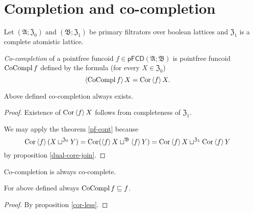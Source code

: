 \section{Completion and co-completion}
\begin{defn}
Let $(\mathfrak{A};\mathfrak{Z}_{0})$ and $(\mathfrak{B};\mathfrak{Z}_{1})$
be primary filtrators over boolean lattices and $\mathfrak{Z}_{1}$
is a complete atomistic lattice.

\emph{Co-completion}
of a pointfree funcoid $f\in\mathsf{pFCD}(\mathfrak{A};\mathfrak{B})$
is pointfree funcoid $\operatorname{CoCompl} f$ defined by the formula (for every
$X\in\mathfrak{Z}_{0}$) 
\[
\left\langle \operatorname{CoCompl} f\right\rangle X=\operatorname{Cor}\left\langle f\right\rangle X.
\]
\end{defn}
\begin{prop}
Above defined co-completion always exists.\end{prop}
\begin{proof}
Existence of $\operatorname{Cor}\left\langle f\right\rangle X$ follows from completeness of $\mathfrak{Z}_{1}$.

We may apply the theorem \ref{pf-cont} because 
\[
\operatorname{Cor}\left\langle f\right\rangle(X\sqcup^{\mathfrak{Z}_{0}}Y)=\operatorname{Cor}(\left\langle f\right\rangle X\sqcup^{\mathfrak{B}}\left\langle f\right\rangle Y)=\operatorname{Cor}\left\langle f\right\rangle X\sqcup^{\mathfrak{Z}_{1}}\operatorname{Cor}\left\langle f\right\rangle Y
\]
by proposition \ref{dual-core-join}.\end{proof}
\begin{obvious}
Co-completion is always co-complete.\end{obvious}
\begin{prop}
For above defined always $\operatorname{CoCompl} f\sqsubseteq f$.\end{prop}
\begin{proof}
By proposition \ref{cor-less}.
\end{proof}

